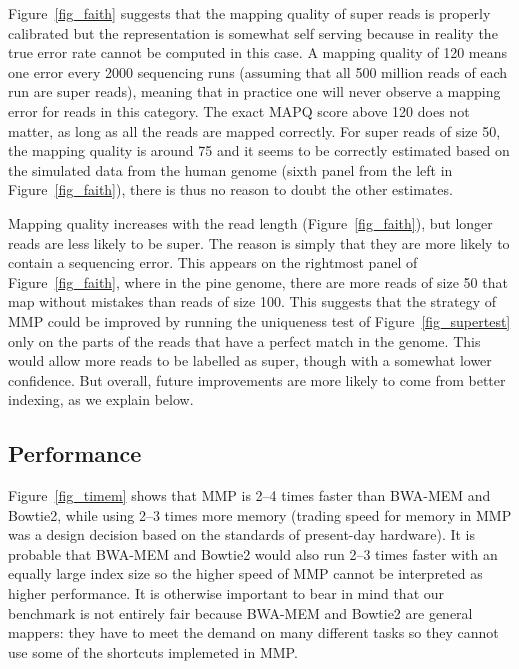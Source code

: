 \documentclass[a4,center,fleqn]{NAR}
\begin{document}
Figure~\ref{fig_faith} suggests that the mapping quality of super reads is
properly calibrated but the representation is somewhat self serving
because in reality the true error rate cannot be computed in this case. A
mapping quality of 120 means one error every 2000 sequencing runs
(assuming that all 500 million reads of each run are super reads), meaning
that in practice one will never observe a mapping error for reads in this
category. The exact MAPQ score above 120 does not matter, as long as all
the reads are mapped correctly. For super reads of size 50, the mapping
quality is around 75 and it seems to be correctly estimated based on the
simulated data from the human genome (sixth panel from the left in
Figure~\ref{fig_faith}), there is thus no reason to doubt the other
estimates.

Mapping quality increases with the read length (Figure~\ref{fig_faith}),
but longer reads are less likely to be super. The reason is simply that
they are more likely to contain a sequencing error. This appears on the
rightmost panel of Figure~\ref{fig_faith}, where in the pine genome, there
are more reads of size 50 that map without mistakes than reads of size
100. This suggests that the strategy of MMP could be improved by running
the uniqueness test of Figure~\ref{fig_supertest} only on the parts of the
reads that have a perfect match in the genome. This would allow more reads
to be labelled as super, though with a somewhat lower confidence. But
overall, future improvements are more likely to come from better indexing,
as we explain below.


\subsection{Performance}

Figure~\ref{fig_timem} shows that MMP is 2--4 times faster than BWA-MEM
and Bowtie2, while using 2--3 times more memory (trading speed for memory
in MMP was a design decision based on the standards of present-day
hardware). It is probable that BWA-MEM and Bowtie2 would also run 2--3
times faster with an equally large index size so the higher speed of MMP
cannot be interpreted as higher performance. It is otherwise important to
bear in mind that our benchmark is not entirely fair because BWA-MEM and
Bowtie2 are general mappers: they have to meet the demand on many
different tasks so they cannot use some of the shortcuts implemeted in
MMP.
\end{document}
